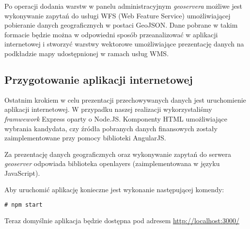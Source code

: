 \documentclass[10pt,a4paper]{article}
\begin{document}
Po operacji dodania warstw w panelu administracyjnym \textit{geoservera} możliwe jest wykonywanie zapytań do usługi WFS (Web Feature Service) umożliwiającej pobieranie danych geograficznych w postaci GeoJSON. Dane pobrane w takim formacie będzie można w odpowiedni sposób przeanalizować w aplikacji internetowej i stworzyć warstwy wektorowe umożliwiające prezentację danych na podkładzie mapy udostępnionej w ramach usług WMS.

\subsection{Przygotowanie aplikacji internetowej}
Ostatnim krokiem w celu prezentacji przechowywanych danych jest uruchomienie aplikacji internetowej. W przypadku naszej realizacji wykorzystaliśmy \textit{framwework} Express oparty o Node.JS. Komponenty HTML umożliwiające wybrania kandydata, czy źródła pobranych danych finansowych zostały zaimplementowane przy pomocy biblioteki AngularJS. 

Za prezentację danych geograficznych oraz wykonywanie zapytań do serwera \textit{geoserver} odpowiada biblioteka openlayers (zaimplementowana w języku JavaScript).

\bigskip \noindent
Aby uruchomić aplikację konieczne jest wykonanie następującej komendy:
\begin{lstlisting}[style=BashInputStyle]
  # npm start
\end{lstlisting}

Teraz domyślnie aplikacja będzie dostępna pod adresem \url{http://localhost:3000/}

\bigskip \noindent
\bigskip \noindent
\end{document}
